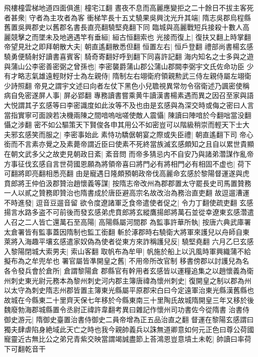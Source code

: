 飛樓橦雲梯地道四面俱進|{
	橦宅江翻}
晝夜不息而高麗應變拒之二十餘日不拔主客死者甚衆|{
	守者為主攻者為客}
衝梯竿長十五丈驍果吳興沈光升其端|{
	隋志吳郡烏程縣舊置吳興郡史以舊郡名書長直亮翻驍堅堯翻下同}
臨城與高麗戰短兵接殺十數人高麗競擊之而墜未及地適遇竿有垂絙|{
	絙古恒翻索也}
光接而復上|{
	復扶又翻上時掌翻}
帝望見壯之即拜朝散大夫|{
	朝直遙翻散悉但翻}
恒置左右|{
	恒戶登翻}
禮部尚書楊玄感驍勇便騎射好讀書喜賓客|{
	騎奇寄翻好呼到翻下同喜許記翻}
海内知名之士多與之遊與蒲山公李密善密弼之曾孫也|{
	李密襲爵蒲山郡公蒲山郡闕李弼宇文氏佐命功臣}
少有才略志氣雄遠輕財好士為左親侍|{
	隋制左右翊衛府領親勲武三侍左親侍屬左翊衛少詩照翻}
帝見之謂宇文述曰向者左仗下黑色小兒聸視異常勿令宿衛述乃諷密使稱病自免密遂屏人事|{
	屏必郢翻}
專務讀書嘗乘黄牛讀漢書楊素遇而異之因召至家與語大悦謂其子玄感等曰李密識度如此汝等不及也由是玄感與為深交時或侮之密曰人言當指實寧可面諛若决機兩陳之間喑嗚咄嗟使敵人震懾|{
	陳讀曰陣喑於今翻咄當没翻懾之涉翻}
密不如公驅策天下賢俊各申其用公不如密豈可以階級稍崇而輕天下士大夫邪玄感笑而服之|{
	李密事始此}
素恃功驕倨朝宴之際或失臣禮|{
	朝直遙翻下司}
帝心銜而不言素亦覺之及素薨帝謂近臣曰使素不死終當族滅玄感頗知之且自以累世貴顯在朝文武多父之故吏見朝政日紊|{
	紊音問}
而帝多猜忌内不自安乃與諸弟濳謀作亂帝方事征伐玄感自言世荷國恩願為將領帝喜曰將門必有將相門必有相固不虚也|{
	荷下可翻將即亮翻相悉亮翻}
由是寵遇日隆頗預朝政帝伐高麗命玄感於黎陽督運遂與虎賁郎將王仲伯汲郡贊治趙懷義等謀|{
	按隋志帝改州為郡郡置太守罷長史司馬置贊務一人以貳之贊務即贊治也隋書成於唐臣避高宗名故改治為務治直吏翻}
故逗遛漕運不時進發|{
	逗音豆遛音留}
欲令度遼諸軍乏食帝遣使者促之|{
	令力丁翻使疏吏翻}
玄感揚言水路多盗不可前後而發玄感弟虎賁郎將玄縱鷹揚郎將萬石並從幸遼東玄感濳遣人召之二人皆亡還萬石至高陽|{
	高陽縣屬河間郡}
為監事許華所執|{
	按唐六典武庫署太倉署皆有監事蓋因隋制也監工銜翻}
斬於涿郡時右驍衛大將軍來護兒以舟師自東萊將入海趣平壤玄感遣家奴偽為使者從東方來詐稱護兒反|{
	驍堅堯翻}
六月乙巳玄感入黎陽閉城大索男夫|{
	索山客翻}
取帆布為牟甲|{
	帆施於船上以汎風時軍興織蒲不給擬布為之牟兜牟也}
署官屬皆凖開皇之舊|{
	不用帝所改官制}
移書傍郡以討護兒為名各令發兵會於倉所|{
	倉謂黎陽倉}
郡縣官有幹用者玄感皆以運糧追集之以趙懷義為衛州刺史東光尉元務本為黎州刺史河内郡主簿唐禕為懷州刺史|{
	復開皇之制以郡為州以太守為刺史隋志州郡皆置主簿東光縣屬平原郡宋白曰今定遠軍治東光縣漢舊縣也故城在今縣東二十里齊天保七年移於今縣東南三十里陶氏故城隋開皇三年又移於後魏廢勃海郡城縣置令丞尉正禕許韋翻考異曰雜記作懷州司功書佐今從隋書}
治書侍御史游元|{
	隋御史臺置治書侍御史二員帝增為正五品治直之翻}
督運在黎陽玄感謂曰獨夫肆虐陷身絶域此天亡之時也我今親帥義兵以誅無道卿意如何元正色曰尊公荷國寵靈近古無比公之弟兄青紫交映當謂竭誠盡節上荅鴻恩豈意墳土未乾|{
	帥讀曰率荷下可翻乾音干}
